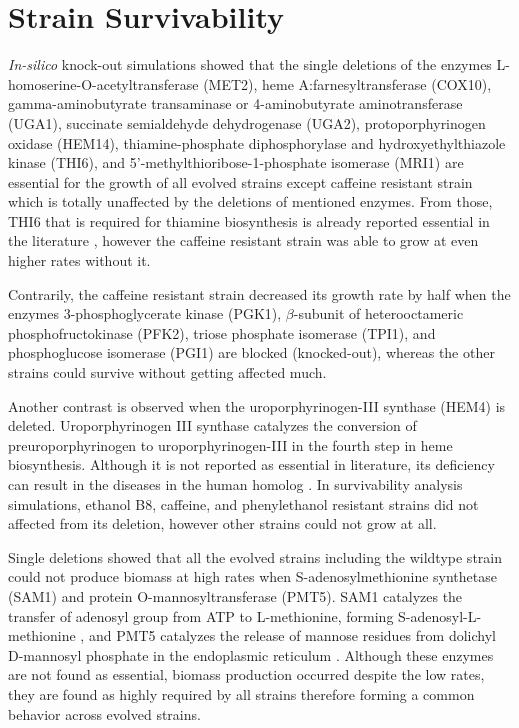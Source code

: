 \section{Strain Survivability}
\emph{In-silico} knock-out simulations showed that the single deletions of the enzymes L-homoserine-O-acetyltransferase (MET2), heme A:farnesyltransferase (COX10), gamma-aminobutyrate transaminase or 4-aminobutyrate aminotransferase (UGA1), succinate semialdehyde dehydrogenase (UGA2), protoporphyrinogen oxidase (HEM14), thiamine-phosphate diphosphorylase and hydroxyethylthiazole kinase (THI6), and 5'-methylthioribose-1-phosphate isomerase (MRI1) are essential for the growth of all evolved strains except caffeine resistant strain which is totally unaffected by the deletions of mentioned enzymes. From those, THI6 that is required for thiamine biosynthesis is already reported essential in the literature \cite{nosaka1994isolation}, however the caffeine resistant strain was able to grow at even higher rates without it.

Contrarily, the caffeine resistant strain decreased its growth rate by half when the enzymes 3-phosphoglycerate kinase (PGK1), $\beta $-subunit of heterooctameric phosphofructokinase (PFK2), triose phosphate isomerase (TPI1), and phosphoglucose isomerase (PGI1) are blocked (knocked-out), whereas the other strains could survive without getting affected much.

Another contrast is observed when the uroporphyrinogen-III synthase (HEM4) is deleted. Uroporphyrinogen III synthase catalyzes the conversion of preuroporphyrinogen to uroporphyrinogen-III in the fourth step in heme biosynthesis\cite{amillet1995isolation}. Although it is not reported as essential in literature, its deficiency can result in the diseases in the human homolog \cite{tan2008identification}. In survivability analysis simulations, ethanol B8, caffeine, and phenylethanol resistant strains did not affected from its deletion, however other strains could not grow at all.

Single deletions showed that all the evolved strains including the wildtype strain could not produce biomass at high rates when S-adenosylmethionine synthetase (SAM1) and protein O-mannosyltransferase (PMT5). SAM1 catalyzes the transfer of adenosyl group from ATP to L-methionine, forming S-adenosyl-L-methionine \cite{chiang1977activation}, and PMT5 catalyzes the release of mannose residues from dolichyl D-mannosyl phosphate in the endoplasmic reticulum \cite{girrbach2003members}. Although these enzymes are not found as essential, biomass production occurred despite the low rates, they are found as highly required by all strains therefore forming a common behavior across evolved strains.

